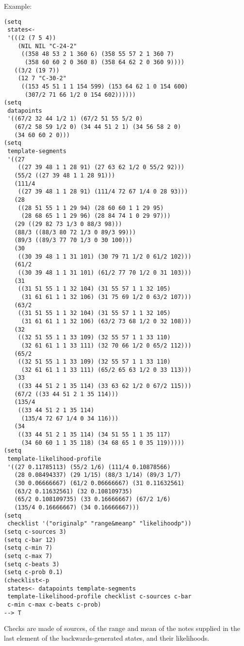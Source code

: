 \vspace{0.5cm}
\noindent Example:
\begin{verbatim}
(setq
 states<-
 '(((2 (7 5 4))
    (NIL NIL "C-24-2"
     ((358 48 53 2 1 360 6) (358 55 57 2 1 360 7)
      (358 60 60 2 0 360 8) (358 64 62 2 0 360 9))))
   ((3/2 (19 7))
    (12 7 "C-30-2"
     ((153 45 51 1 1 154 599) (153 64 62 1 0 154 600)
      (307/2 71 66 1/2 0 154 602))))))
(setq
 datapoints
 '((67/2 32 44 1/2 1) (67/2 51 55 5/2 0)
   (67/2 58 59 1/2 0) (34 44 51 2 1) (34 56 58 2 0)
   (34 60 60 2 0)))
(setq
 template-segments
 '((27
    ((27 39 48 1 1 28 91) (27 63 62 1/2 0 55/2 92)))
   (55/2 ((27 39 48 1 1 28 91)))
   (111/4
    ((27 39 48 1 1 28 91) (111/4 72 67 1/4 0 28 93)))
   (28
    ((28 51 55 1 1 29 94) (28 60 60 1 1 29 95)
     (28 68 65 1 1 29 96) (28 84 74 1 0 29 97)))
   (29 ((29 82 73 1/3 0 88/3 98)))
   (88/3 ((88/3 80 72 1/3 0 89/3 99)))
   (89/3 ((89/3 77 70 1/3 0 30 100)))
   (30
    ((30 39 48 1 1 31 101) (30 79 71 1/2 0 61/2 102)))
   (61/2
    ((30 39 48 1 1 31 101) (61/2 77 70 1/2 0 31 103)))
   (31
    ((31 51 55 1 1 32 104) (31 55 57 1 1 32 105)
     (31 61 61 1 1 32 106) (31 75 69 1/2 0 63/2 107)))
   (63/2
    ((31 51 55 1 1 32 104) (31 55 57 1 1 32 105)
     (31 61 61 1 1 32 106) (63/2 73 68 1/2 0 32 108)))
   (32
    ((32 51 55 1 1 33 109) (32 55 57 1 1 33 110)
     (32 61 61 1 1 33 111) (32 70 66 1/2 0 65/2 112)))
   (65/2
    ((32 51 55 1 1 33 109) (32 55 57 1 1 33 110)
     (32 61 61 1 1 33 111) (65/2 65 63 1/2 0 33 113)))
   (33
    ((33 44 51 2 1 35 114) (33 63 62 1/2 0 67/2 115)))
   (67/2 ((33 44 51 2 1 35 114)))
   (135/4
    ((33 44 51 2 1 35 114)
     (135/4 72 67 1/4 0 34 116)))
   (34
    ((33 44 51 2 1 35 114) (34 51 55 1 1 35 117)
     (34 60 60 1 1 35 118) (34 68 65 1 0 35 119)))))
(setq
 template-likelihood-profile
 '((27 0.11785113) (55/2 1/6) (111/4 0.10878566)
   (28 0.08494337) (29 1/15) (88/3 1/14) (89/3 1/7)
   (30 0.06666667) (61/2 0.06666667) (31 0.11632561)
   (63/2 0.11632561) (32 0.108109735)
   (65/2 0.108109735) (33 0.16666667) (67/2 1/6)
   (135/4 0.16666667) (34 0.16666667)))
(setq
 checklist '("originalp" "range&meanp" "likelihoodp"))
(setq c-sources 3)
(setq c-bar 12)
(setq c-min 7)
(setq c-max 7)
(setq c-beats 3)
(setq c-prob 0.1)
(checklist<-p
 states<- datapoints template-segments
 template-likelihood-profile checklist c-sources c-bar
 c-min c-max c-beats c-prob)
--> T
\end{verbatim}

\noindent Checks are made of sources, of the range
and mean of the notes supplied in the last element of
the backwards-generated states, and their
likelihoods.



